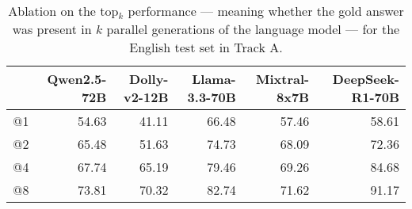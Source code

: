\begin{table*}
\centering
\begin{tabular}{lrrrrr}
\toprule
 & Qwen2.5-72B & Dolly-v2-12B & Llama-3.3-70B & Mixtral-8x7B & DeepSeek-R1-70B \\
\midrule
@1 & 54.63 & 41.11 & 66.48 & 57.46 & 58.61 \\
@2 & 65.48 & 51.63 & 74.73 & 68.09 & 72.36 \\
@4 & 67.74 & 65.19 & 79.46 & 69.26 & 84.68 \\
@8 & 73.81 & 70.32 & 82.74 & 71.62 & 91.17 \\
\bottomrule
\end{tabular}
\caption{Ablation on the top$_k$ performance --- meaning whether the gold answer was present in $k$ parallel generations of the language model --- for the English test set in Track A.}
\label{tab:ablation-topk}
\end{table*}